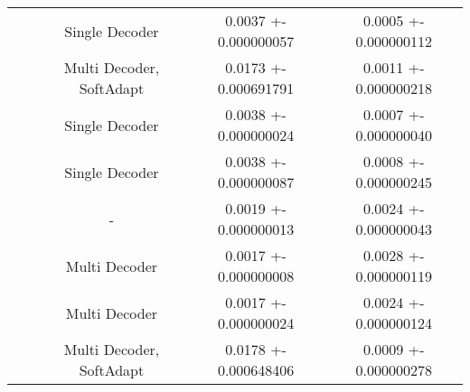 \begin{center}
\begin{tabular}{||c|c|c|c|c||}
\cline{3-5}
 &  & Single Decoder & 0.0037 +- 0.000000057 & 0.0005 +- 0.000000112 \\
\cline{3-5}
 &  & Multi Decoder, SoftAdapt & 0.0173 +- 0.000691791 & 0.0011 +- 0.000000218 \\
\cline{3-5}
 &  & Single Decoder & 0.0038 +- 0.000000024 & 0.0007 +- 0.000000040 \\
\cline{3-5}
 &  & Single Decoder & 0.0038 +- 0.000000087 & 0.0008 +- 0.000000245 \\
\cline{3-5}
 &  & - & 0.0019 +- 0.000000013 & 0.0024 +- 0.000000043 \\
\cline{3-5}
 &  & Multi Decoder & 0.0017 +- 0.000000008 & 0.0028 +- 0.000000119 \\
\cline{3-5}
 &  & Multi Decoder & 0.0017 +- 0.000000024 & 0.0024 +- 0.000000124 \\
\cline{3-5}
 &  & Multi Decoder, SoftAdapt & 0.0178 +- 0.000648406 & 0.0009 +- 0.000000278 \\
\cline{2-5}
\hline
\end{tabular}
\end{center}
